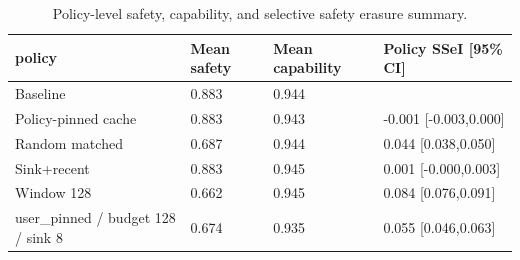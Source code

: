 \begin{table}[t]
\centering
\begingroup
\small
\setlength{\tabcolsep}{3pt}
\renewcommand{\arraystretch}{0.94}
\begin{tabularx}{\linewidth}{@{}lXXX@{}}
\toprule
policy & Mean safety & Mean capability & Policy SSeI [95\% CI] \\
\midrule
Baseline & 0.883 & 0.944 &  \\
Policy-pinned cache & 0.883 & 0.943 & -0.001 [-0.003,0.000] \\
Random matched & 0.687 & 0.944 & 0.044 [0.038,0.050] \\
Sink+recent & 0.883 & 0.945 & 0.001 [-0.000,0.003] \\
Window 128 & 0.662 & 0.945 & 0.084 [0.076,0.091] \\
user\_pinned / budget 128 / sink 8 & 0.674 & 0.935 & 0.055 [0.046,0.063] \\
\bottomrule
\end{tabularx}
\endgroup
\caption{Policy-level safety, capability, and selective safety erasure summary.}
\label{tab:main-results}
\end{table}

